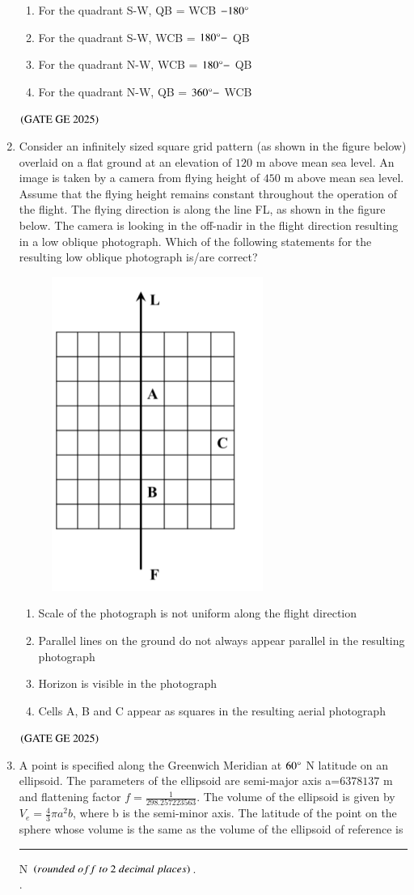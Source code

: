 \documentclass[journal,12pt,onecolumn]{IEEEtran}
\theoremstyle{remark}
\begin{document}
\begin{enumerate}
\begin{enumerate}
\item For the quadrant S-W, QB = WCB $-180\degree$
\item For the quadrant S-W, WCB = $180\degree -$ QB
\item For the quadrant N-W, WCB = $180\degree -$ QB
\item For the quadrant N-W, QB = $360\degree -$ WCB
\end{enumerate}
\hfill $\left(\text{GATE GE 2025}\right)$
\bigskip
\item Consider an infinitely sized square grid pattern (as shown in the figure below) overlaid on a flat ground at an elevation of $120$ m above mean sea level. An image is taken by a camera from flying height of $450$ m above mean sea level. Assume that the flying height remains constant throughout the operation of the flight. The flying direction is along the line FL, as shown in the figure below. The camera is looking in the off-nadir in the flight direction resulting in a low oblique photograph. Which of the following statements for the resulting low oblique photograph is/are correct?
\begin{figure}[H]
    \centering
    \includegraphics[width=0.2\columnwidth]{figs/fig11.png}
    \caption{}
    \label{figs:fig11}
\end{figure}
\begin{enumerate}
\item Scale of the photograph is not uniform along the flight direction
\item Parallel lines on the ground do not always appear parallel in the resulting photograph
\item Horizon is visible in the photograph
\item Cells A, B and C appear as squares in the resulting aerial photograph
\end{enumerate}
\hfill $\left(\text{GATE GE 2025}\right)$
\bigskip
\item A point is specified along the Greenwich Meridian at $60\degree$ N latitude on an ellipsoid. The parameters of the ellipsoid are semi-major axis a=$6378137$ m and flattening factor $f = \frac{1}{298.257223563}$. The volume of the ellipsoid is given by $V_e = \frac{4}{3}\pi a^2 b$, where b is the semi-minor axis. The latitude of the point on the sphere whose volume is the same as the volume of the ellipsoid of reference is \rule{2cm}{0.5mm}\degree N $\brak{rounded\ off\ to\ 2\ decimal\ places}$.\\.

\end{enumerate}
\end{document}
